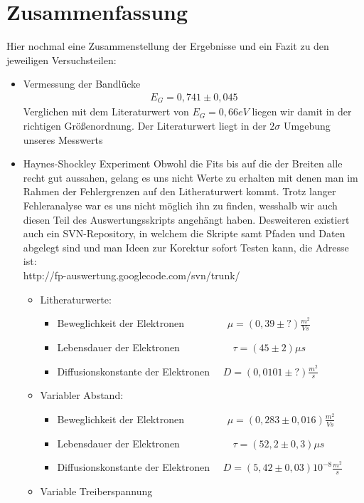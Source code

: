 \documentclass[12pt]{article}
\begin{document}
\section{Zusammenfassung}
Hier nochmal eine Zusammenstellung der Ergebnisse und ein Fazit zu den jeweiligen Versuchsteilen:
\begin{itemize}
 \item Vermessung der Bandlücke
\begin{align*}
 E_G = 0,741 \pm 0,045
\end{align*}
Verglichen mit dem Literaturwert von $E_G = 0,66 eV$ liegen wir damit in der richtigen Größenordnung. Der Literaturwert liegt in der $2\sigma$ Umgebung unseres Messwerts
\item Haynes-Shockley Experiment
Obwohl die Fits bis auf die der Breiten alle recht gut aussahen, gelang es uns nicht Werte zu erhalten mit denen man im Rahmen der Fehlergrenzen auf den Litheraturwert kommt. Trotz langer Fehleranalyse war es uns nicht möglich ihn zu finden, wesshalb wir auch diesen Teil des Auswertungsskripts angehängt haben. Desweiteren existiert auch ein SVN-Repository, in welchem die Skripte samt Pfaden und Daten abgelegt sind und man Ideen zur Korektur sofort Testen kann, die Adresse ist: \\ http://fp-auswertung.googlecode.com/svn/trunk/
\begin{itemize}
\item Litheraturwerte:
\begin{itemize}
 \item Beweglichkeit der Elektronen ~~~~~~~~$\mu = (0,39 \pm ?) \frac{m^2}{Vs}$ 
 \item Lebensdauer der Elektronen ~~~~~~~~~~$\tau = (45 \pm 2) \mu s $
 \item Diffusionskonstante der Elektronen ~~$D = (0,0101 \pm ?) \frac{m^2}{s}$
\end{itemize}
\item Variabler Abstand:
\begin{itemize}
 \item Beweglichkeit der Elektronen ~~~~~~~~$\mu = (0,283 \pm 0,016) \frac{m^2}{Vs}$ 
 \item Lebensdauer der Elektronen ~~~~~~~~~~$\tau = (52,2 \pm 0,3) \mu s $
 \item Diffusionskonstante der Elektronen ~~$D = (5,42 \pm 0,03) 10^{-8} \frac{m^2}{s}$
\end{itemize}
\item Variable Treiberspannung
\begin{itemize}

\end{itemize}
\end{itemize}
\end{itemize}
\end{document}
